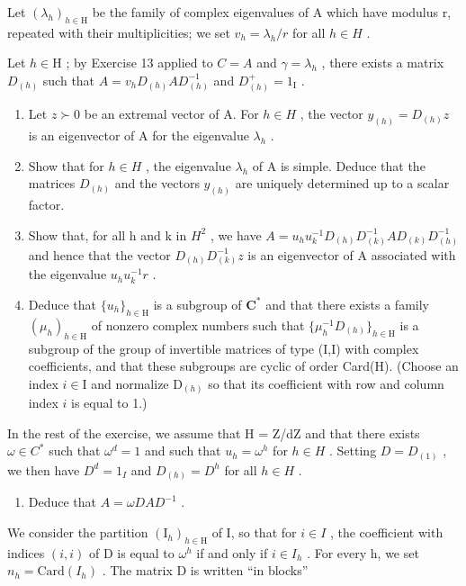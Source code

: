 Let \((\lambda_{h})_{h\in\mathrm{H}}\) be the family of complex eigenvalues of A which have modulus r, repeated with their multiplicities; we set \(v_{h}=\lambda_{h}/r\) for all \(h\in H\) .

Let \(h \in \mathrm{H}\) ; by Exercise 13 applied to \(C = A\) and \(\gamma = \lambda_h\) , there exists a matrix \(D_{(h)}\) such that \(A = v_h D_{(h)} AD_{(h)}^{-1}\) and \(D_{(h)}^+ = 1_{\mathrm{I}}\) .

\begin{enumerate}
\def\labelenumi{\alph{enumi})}
\item
  Let \(z \succ 0\) be an extremal vector of A. For \(h \in H\) , the vector \(y_{(h)} = D_{(h)}z\) is an eigenvector of A for the eigenvalue \(\lambda_{h}\) .
\item
  Show that for \(h \in H\) , the eigenvalue \(\lambda_{h}\) of A is simple. Deduce that the matrices \(D_{(h)}\) and the vectors \(y_{(h)}\) are uniquely determined up to a scalar factor.
\item
  Show that, for all h and k in \(H^{2}\) , we have \(A = u_{h}u_{k}^{-1}D_{(h)}D_{(k)}^{-1}AD_{(k)}D_{(h)}^{-1}\) and hence that the vector \(D_{(h)}D_{(k)}^{-1}z\) is an eigenvector of A associated with the eigenvalue \(u_{h}u_{k}^{-1}r\) .
\item
  Deduce that \(\{u_h\}_{h\in \mathrm{H}}\) is a subgroup of \(\mathbf{C}^*\) and that there exists a family \((\mu_h)_{h\in \mathrm{H}}\) of nonzero complex numbers such that \(\{\mu_h^{-1}D_{(h)}\}_{h\in \mathrm{H}}\) is a subgroup of the group of invertible matrices of type (I,I) with complex coefficients, and that these subgroups are cyclic of order Card(H). (Choose an index \(i\in \mathrm{I}\) and normalize \(\mathrm{D}_{(h)}\) so that its coefficient with row and column index \(i\) is equal to 1.)
\end{enumerate}

In the rest of the exercise, we assume that H = Z/dZ and that there exists \(\omega \in C^{*}\) such that \(\omega^{d} = 1\) and such that \(u_{h} = \omega^{h}\) for \(h \in H\) . Setting \(D = D_{(1)}\) , we then have \(D^{d} = 1_{I}\) and \(D_{(h)} = D^{h}\) for all \(h \in H\) .

\begin{enumerate}
\def\labelenumi{\alph{enumi})}
\setcounter{enumi}{4}
\tightlist
\item
  Deduce that \(A = \omega DAD^{-1}\) .
\end{enumerate}

We consider the partition \((\mathrm{I}_{h})_{h\in\mathrm{H}}\) of I, so that for \(i\in I\) , the coefficient with indices \((i,i)\) of D is equal to \(\omega^{h}\) if and only if \(i\in I_{h}\) . For every h, we set \(n_{h}=\mathrm{Card}(I_{h})\) . The matrix D is written “in blocks”

